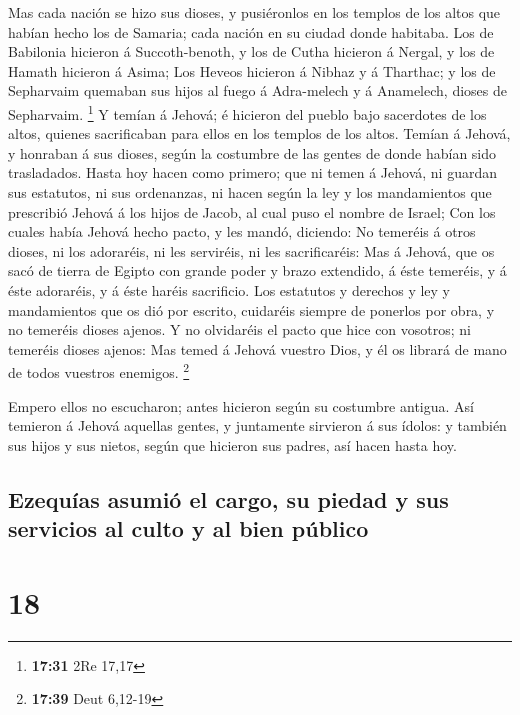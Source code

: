  Mas cada nación se hizo sus dioses, y pusiéronlos en los
templos de los altos que habían hecho los de Samaria; cada nación en su
ciudad donde habitaba.  Los de Babilonia hicieron á
Succoth-benoth, y los de Cutha hicieron á Nergal, y los de Hamath
hicieron á Asima;  Los Heveos hicieron á Nibhaz y á
Tharthac; y los de Sepharvaim quemaban sus hijos al fuego á Adra-melech
y á Anamelech, dioses de Sepharvaim. \footnote{\textbf{17:31} 2Re 17,17}
 Y temían á Jehová; é hicieron del pueblo bajo sacerdotes
de los altos, quienes sacrificaban para ellos en los templos de los
altos.  Temían á Jehová, y honraban á sus dioses, según la
costumbre de las gentes de donde habían sido trasladados. 
Hasta hoy hacen como primero; que ni temen á Jehová, ni guardan sus
estatutos, ni sus ordenanzas, ni hacen según la ley y los mandamientos
que prescribió Jehová á los hijos de Jacob, al cual puso el nombre de
Israel;  Con los cuales había Jehová hecho pacto, y les
mandó, diciendo: No temeréis á otros dioses, ni los adoraréis, ni les
serviréis, ni les sacrificaréis:  Mas á Jehová, que os sacó
de tierra de Egipto con grande poder y brazo extendido, á éste temeréis,
y á éste adoraréis, y á éste haréis sacrificio.  Los
estatutos y derechos y ley y mandamientos que os dió por escrito,
cuidaréis siempre de ponerlos por obra, y no temeréis dioses ajenos.
 Y no olvidaréis el pacto que hice con vosotros; ni
temeréis dioses ajenos:  Mas temed á Jehová vuestro Dios, y
él os librará de mano de todos vuestros enemigos. \footnote{\textbf{17:39}
  Deut 6,12-19}

 Empero ellos no escucharon; antes hicieron según su
costumbre antigua.  Así temieron á Jehová aquellas gentes,
y juntamente sirvieron á sus ídolos: y también sus hijos y sus nietos,
según que hicieron sus padres, así hacen hasta hoy.

\hypertarget{ezequuxedas-asumiuxf3-el-cargo-su-piedad-y-sus-servicios-al-culto-y-al-bien-puxfablico}{%
\subsection{Ezequías asumió el cargo, su piedad y sus servicios al culto
y al bien
público}\label{ezequuxedas-asumiuxf3-el-cargo-su-piedad-y-sus-servicios-al-culto-y-al-bien-puxfablico}}

\hypertarget{section-17}{%
\section{18}\label{section-17}}

